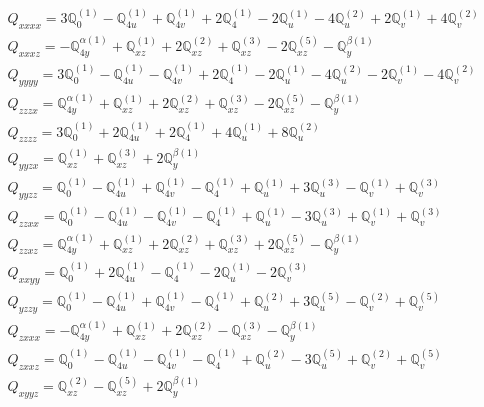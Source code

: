 \documentclass[fleqn,8pt,landscape]{jsarticle}
\begin{document}
\begin{align*}
& Q_{xxxx} = 3 \mathbb{Q}_{0}^{(1)} - \mathbb{Q}_{4u}^{(1)} + \mathbb{Q}_{4v}^{(1)} + 2 \mathbb{Q}_{4}^{(1)} - 2 \mathbb{Q}_{u}^{(1)} - 4 \mathbb{Q}_{u}^{(2)} + 2 \mathbb{Q}_{v}^{(1)} + 4 \mathbb{Q}_{v}^{(2)} \\
& Q_{xxxz} = - \mathbb{Q}_{4y}^{\alpha(1)} + \mathbb{Q}_{xz}^{(1)} + 2 \mathbb{Q}_{xz}^{(2)} + \mathbb{Q}_{xz}^{(3)} - 2 \mathbb{Q}_{xz}^{(5)} - \mathbb{Q}_{y}^{\beta(1)} \\
& Q_{yyyy} = 3 \mathbb{Q}_{0}^{(1)} - \mathbb{Q}_{4u}^{(1)} - \mathbb{Q}_{4v}^{(1)} + 2 \mathbb{Q}_{4}^{(1)} - 2 \mathbb{Q}_{u}^{(1)} - 4 \mathbb{Q}_{u}^{(2)} - 2 \mathbb{Q}_{v}^{(1)} - 4 \mathbb{Q}_{v}^{(2)} \\
& Q_{zzzx} = \mathbb{Q}_{4y}^{\alpha(1)} + \mathbb{Q}_{xz}^{(1)} + 2 \mathbb{Q}_{xz}^{(2)} + \mathbb{Q}_{xz}^{(3)} - 2 \mathbb{Q}_{xz}^{(5)} - \mathbb{Q}_{y}^{\beta(1)} \\
& Q_{zzzz} = 3 \mathbb{Q}_{0}^{(1)} + 2 \mathbb{Q}_{4u}^{(1)} + 2 \mathbb{Q}_{4}^{(1)} + 4 \mathbb{Q}_{u}^{(1)} + 8 \mathbb{Q}_{u}^{(2)} \\
& Q_{yyzx} = \mathbb{Q}_{xz}^{(1)} + \mathbb{Q}_{xz}^{(3)} + 2 \mathbb{Q}_{y}^{\beta(1)} \\
& Q_{yyzz} = \mathbb{Q}_{0}^{(1)} - \mathbb{Q}_{4u}^{(1)} + \mathbb{Q}_{4v}^{(1)} - \mathbb{Q}_{4}^{(1)} + \mathbb{Q}_{u}^{(1)} + 3 \mathbb{Q}_{u}^{(3)} - \mathbb{Q}_{v}^{(1)} + \mathbb{Q}_{v}^{(3)} \\
& Q_{zzxx} = \mathbb{Q}_{0}^{(1)} - \mathbb{Q}_{4u}^{(1)} - \mathbb{Q}_{4v}^{(1)} - \mathbb{Q}_{4}^{(1)} + \mathbb{Q}_{u}^{(1)} - 3 \mathbb{Q}_{u}^{(3)} + \mathbb{Q}_{v}^{(1)} + \mathbb{Q}_{v}^{(3)} \\
& Q_{zzxz} = \mathbb{Q}_{4y}^{\alpha(1)} + \mathbb{Q}_{xz}^{(1)} + 2 \mathbb{Q}_{xz}^{(2)} + \mathbb{Q}_{xz}^{(3)} + 2 \mathbb{Q}_{xz}^{(5)} - \mathbb{Q}_{y}^{\beta(1)} \\
& Q_{xxyy} = \mathbb{Q}_{0}^{(1)} + 2 \mathbb{Q}_{4u}^{(1)} - \mathbb{Q}_{4}^{(1)} - 2 \mathbb{Q}_{u}^{(1)} - 2 \mathbb{Q}_{v}^{(3)} \\
& Q_{yzzy} = \mathbb{Q}_{0}^{(1)} - \mathbb{Q}_{4u}^{(1)} + \mathbb{Q}_{4v}^{(1)} - \mathbb{Q}_{4}^{(1)} + \mathbb{Q}_{u}^{(2)} + 3 \mathbb{Q}_{u}^{(5)} - \mathbb{Q}_{v}^{(2)} + \mathbb{Q}_{v}^{(5)} \\
& Q_{zxxx} = - \mathbb{Q}_{4y}^{\alpha(1)} + \mathbb{Q}_{xz}^{(1)} + 2 \mathbb{Q}_{xz}^{(2)} - \mathbb{Q}_{xz}^{(3)} - \mathbb{Q}_{y}^{\beta(1)} \\
& Q_{zxxz} = \mathbb{Q}_{0}^{(1)} - \mathbb{Q}_{4u}^{(1)} - \mathbb{Q}_{4v}^{(1)} - \mathbb{Q}_{4}^{(1)} + \mathbb{Q}_{u}^{(2)} - 3 \mathbb{Q}_{u}^{(5)} + \mathbb{Q}_{v}^{(2)} + \mathbb{Q}_{v}^{(5)} \\
& Q_{xyyz} = \mathbb{Q}_{xz}^{(2)} - \mathbb{Q}_{xz}^{(5)} + 2 \mathbb{Q}_{y}^{\beta(1)}
\end{align*}
\end{document}
